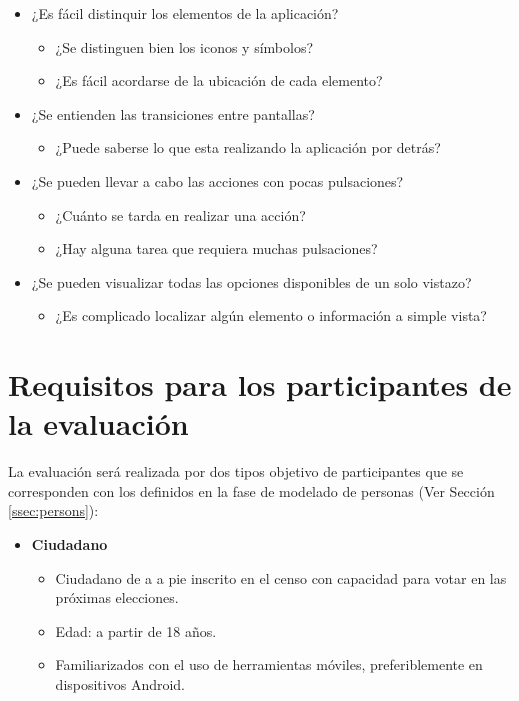 \begin{itemize}
 \item ¿Es fácil distinquir los elementos de la aplicación?
 \begin{itemize}
  \item ¿Se distinguen bien los iconos y símbolos?
  \item ¿Es fácil acordarse de la ubicación de cada elemento?
 \end{itemize}
 \item ¿Se entienden las transiciones entre pantallas?
 \begin{itemize}
  \item ¿Puede saberse lo que esta realizando la aplicación por detrás?
 \end{itemize}
  \item ¿Se pueden llevar a cabo las acciones con pocas pulsaciones?
  \begin{itemize}
   \item ¿Cuánto se tarda en realizar una acción?
   \item ¿Hay alguna tarea que requiera muchas pulsaciones?
  \end{itemize}
  \item ¿Se pueden visualizar todas las opciones disponibles de un solo vistazo?
  \begin{itemize}
   \item ¿Es complicado localizar algún elemento o información a simple vista?
  \end{itemize}
 \end{itemize}

\section{Requisitos para los participantes de la evaluación}

La evaluación será realizada por dos tipos objetivo de participantes que se corresponden con los definidos en la fase de modelado de personas (Ver Sección \ref{ssec:persons}):

\begin{itemize}
 \item \textbf{Ciudadano}
 \begin{itemize}
  \item Ciudadano de a a pie inscrito en el censo con capacidad para votar en las próximas elecciones.
  \item Edad: a partir de 18 años.
  \item Familiarizados con el uso de herramientas móviles, preferiblemente en dispositivos Android.
 \end{itemize}
\end{itemize}

